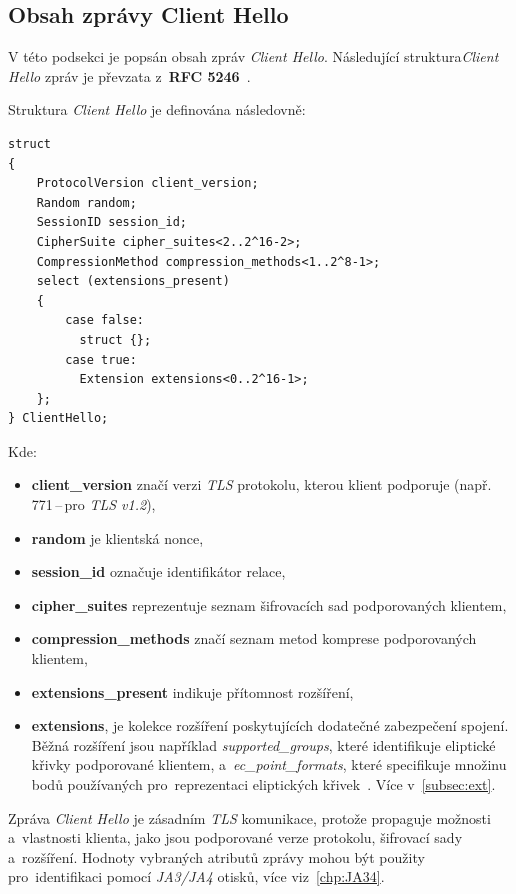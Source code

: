 \subsection{Obsah zprávy Client Hello}
\label{sec:clienthello}
V této podsekci je popsán obsah zpráv \textit{Client Hello}. Následující struktura\textit{Client Hello} zpráv je převzata z~\textbf{RFC 5246}~\cite{rfc-tls12}. 

Struktura \textit{Client Hello} je definována následovně:
\begin{verbatim}
struct 
{
    ProtocolVersion client_version;
    Random random;
    SessionID session_id;
    CipherSuite cipher_suites<2..2^16-2>;
    CompressionMethod compression_methods<1..2^8-1>;
    select (extensions_present) 
    {
        case false:
          struct {};
        case true:
          Extension extensions<0..2^16-1>;
    };
} ClientHello;
\end{verbatim}
Kde:
\begin{itemize}
	\item \textbf{client\_version} značí verzi \textit{TLS} protokolu, kterou klient podporuje (např. 771\,--\,pro \textit{TLS v1.2}),
	\item \textbf{random} je klientská nonce,
	\item \textbf{session\_id} označuje identifikátor relace,
	\item \textbf{cipher\_suites} reprezentuje seznam šifrovacích sad podporovaných klientem,
	\item \textbf{compression\_methods} značí seznam metod komprese podporovaných klientem,
	\item \textbf{extensions\_present} indikuje přítomnost rozšíření,
	\item \textbf{extensions}, je kolekce rozšíření poskytujících dodatečné zabezpečení spojení. Běžná rozšíření jsou například \textit{supported\_groups}, které identifikuje eliptické křivky podporované klientem, a~\textit{ec\_point\_formats}, které specifikuje množinu bodů používaných pro~reprezentaci eliptických křivek~\cite{rfc-tls-ext}. Více v~\ref{subsec:ext}.
\end{itemize} 

Zpráva \textit{Client Hello} je zásadním  \textit{TLS} komunikace, protože propaguje možnosti a~vlastnosti klienta, jako jsou podporované verze protokolu, šifrovací sady a~rozšíření. Hodnoty vybraných atributů zprávy  mohou být použity pro~identifikaci pomocí \textit{JA3/JA4} otisků, více viz~\ref{chp:JA34}.


